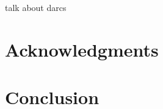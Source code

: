 \documentclass{InsightArticle}
\begin{document}
talk about darcs

\section{Acknowledgments}



\section{Conclusion}










\appendix





\nocite{ITKSoftwareGuide}
\end{document}
